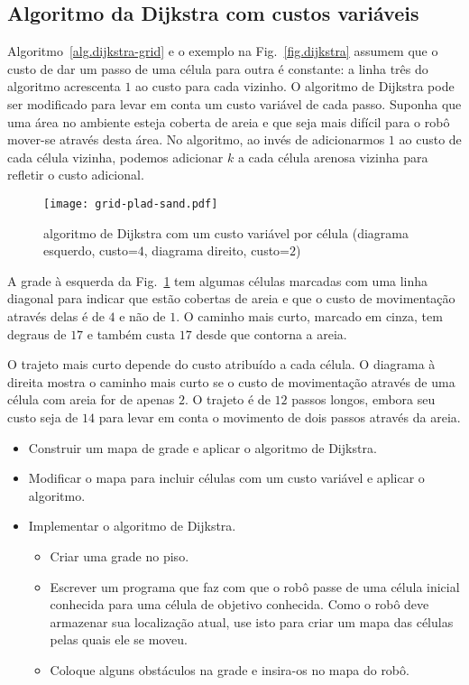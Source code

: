 \subsection{Algoritmo da Dijkstra com custos variáveis}

Algoritmo~\ref{alg.dijkstra-grid} e o exemplo na Fig.~\ref{fig.dijkstra} assumem que o custo de dar um passo de uma célula para outra é constante: a linha três do algoritmo acrescenta $1$ ao custo para cada vizinho. O algoritmo de Dijkstra pode ser modificado para levar em conta um custo variável de cada passo. Suponha que uma área no ambiente esteja coberta de areia e que seja mais difícil para o robô mover-se através desta área. No algoritmo, ao invés de adicionarmos $1$ ao custo de cada célula vizinha, podemos adicionar $k$ a cada célula arenosa vizinha para refletir o custo adicional.

\begin{figure}
\begin{center}
\texttt{[image: grid-plad-sand.pdf]}
\end{center}
\caption{algoritmo de Dijkstra com um custo variável por célula (diagrama esquerdo, custo=$4$, diagrama direito, custo=$2$)}\label{fig.path-sand}
\end{figure}

A grade à esquerda da Fig.~\ref{fig.path-sand} tem algumas células marcadas com uma linha diagonal para indicar que estão cobertas de areia e que o custo de movimentação através delas é de $4$ e não de $1$. O caminho mais curto, marcado em cinza, tem degraus de $17$ e também custa $17$ desde que contorna a areia.

O trajeto mais curto depende do custo atribuído a cada célula. O diagrama à direita mostra o caminho mais curto se o custo de movimentação através de uma célula com areia for de apenas $2$. O trajeto é de $12$ passos longos, embora seu custo seja de $14$ para levar em conta o movimento de dois passos através da areia.

\begin{framed}
\begin{itemize}
\item Construir um mapa de grade e aplicar o algoritmo de Dijkstra.
\item Modificar o mapa para incluir células com um custo variável e aplicar o algoritmo.
\item Implementar o algoritmo de Dijkstra.
\begin{itemize}
\item Criar uma grade no piso.
\item Escrever um programa que faz com que o robô passe de uma célula inicial conhecida para uma célula de objetivo conhecida. Como o robô deve armazenar sua localização atual, use isto para criar um mapa das células pelas quais ele se moveu.
\item Coloque alguns obstáculos na grade e insira-os no mapa do robô.
\end{itemize}
\end{itemize}
\end{framed}

